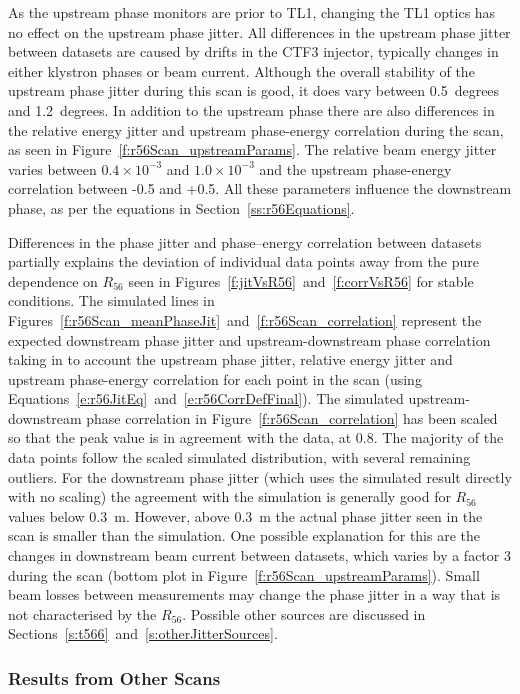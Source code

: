 As the upstream phase monitors are prior to TL1, changing the TL1 optics has no effect on the upstream phase jitter. All differences in the upstream phase jitter between datasets are caused by drifts in the CTF3 injector, typically changes in either klystron phases or beam current. Although the overall stability of the upstream phase jitter during this scan is good, it does vary between 0.5~degrees and 1.2~degrees. In addition to the upstream phase there are also differences in the relative energy jitter and upstream phase-energy correlation during the scan, as seen in Figure~\ref{f:r56Scan_upstreamParams}. The relative beam energy jitter varies between \(0.4\times10^{-3}\) and \(1.0\times10^{-3}\) and the upstream phase-energy correlation between -0.5 and +0.5. All these parameters influence the downstream phase, as per the equations in Section~\ref{ss:r56Equations}.

Differences in the phase jitter and phase--energy correlation between datasets partially explains the deviation of individual data points away from the pure dependence on \(R_{56}\) seen in Figures~\ref{f:jitVsR56}~and~\ref{f:corrVsR56} for stable conditions. The simulated lines in Figures~\ref{f:r56Scan_meanPhaseJit}~and~\ref{f:r56Scan_correlation} represent the expected downstream phase jitter and upstream-downstream phase correlation taking in to account the upstream phase jitter, relative energy jitter and upstream phase-energy correlation for each point in the scan (using Equations~\ref{e:r56JitEq}~and~\ref{e:r56CorrDefFinal}). The simulated upstream-downstream phase correlation in Figure~\ref{f:r56Scan_correlation} has been scaled so that the peak value is in agreement with the data, at 0.8. The majority of the data points follow the scaled simulated distribution, with several remaining outliers. For the downstream phase jitter (which uses the simulated result directly with no scaling) the agreement with the simulation is generally good for \(R_{56}\) values below 0.3~m. However, above 0.3~m the actual phase jitter seen in the scan is smaller than the simulation. One possible explanation for this are the changes in downstream beam current between datasets, which varies by a factor 3 during the scan (bottom plot in Figure~\ref{f:r56Scan_upstreamParams}). Small beam losses between measurements may change the phase jitter in a way that is not characterised by the \(R_{56}\). Possible other sources are discussed in Sections~\ref{s:t566}~and~\ref{s:otherJitterSources}.


\subsubsection{Results from Other Scans}

